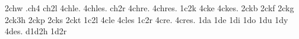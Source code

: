 {2chw                                                                            
.ch4                                                                            
ch2l                                                                            
4chle.                                                                          
4chles.                                                                         
ch2r                                                                            
4chre.                                                                          
4chres.                                                                         
1c2k                                                                            
4cke                                                                            
4ckes.                                                                          
2ckb                                                                            
2ckf                                                                            
2ckg                                                                            
2ck3h                                                                           
2ckp                                                                            
2cks                                                                            
2ckt                                                                            
1c2l                                                                            
4cle                                                                            
4cles                                                                           
1c2r                                                                            
4cre.                                                                           
4cres.                                                                          
1da                                                                             
1de                                                                             
1di                                                                             
1do                                                                             
1du                                                                             
1dy                                                                             
4des.                                                                           
d1d2h                                                                           
1d2r                                                                            
}
